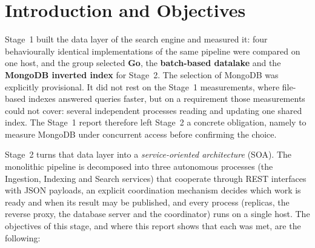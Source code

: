 \documentclass[10pt,a4paper]{article}
\begin{document}
\tableofcontents
\clearpage
{}

\setcounter{section}{1}
\section{Introduction and Objectives}
\label{sec:introduction}

Stage~1 built the data layer of the search engine and measured it: four
behaviourally identical implementations of the same pipeline were compared on
one host, and the group selected \textbf{Go}, the \textbf{batch-based
datalake} and the \textbf{MongoDB inverted index} for Stage~2. The selection
of MongoDB was explicitly provisional. It did not rest on the Stage~1
measurements, where file-based indexes answered queries faster, but on a
requirement those measurements could not cover: several independent processes
reading and updating one shared index. The Stage~1 report therefore left
Stage~2 a concrete obligation, namely to measure MongoDB under concurrent
access before confirming the choice.

Stage~2 turns that data layer into a \emph{service-oriented architecture}
(SOA). The monolithic pipeline is decomposed into three autonomous processes
(the Ingestion, Indexing and Search services) that cooperate through REST
interfaces with JSON payloads, an explicit coordination mechanism decides which
work is ready and when its result may be published, and every process
(replicas, the reverse proxy, the database server and the coordinator) runs on
a single host. The objectives of this stage, and where this report shows that
each was met, are the following:
\end{document}
